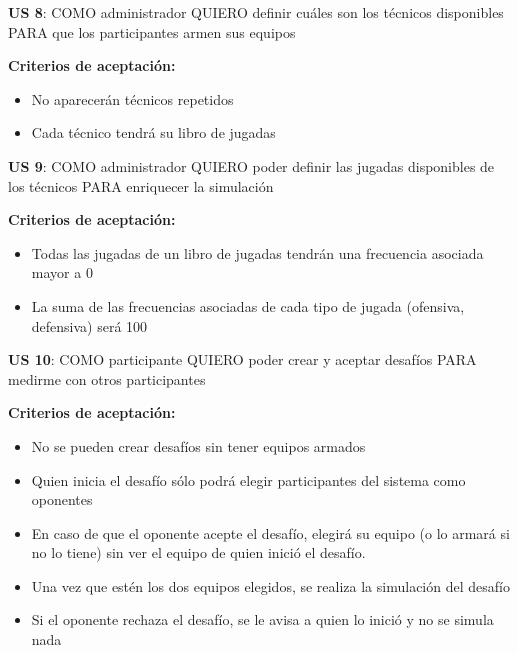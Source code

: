 \begin{tcolorbox}
\textbf{US 8}: COMO administrador QUIERO definir cuáles son los técnicos disponibles PARA que los participantes armen sus equipos

\vline

\textbf{Criterios de aceptación:}
\begin{itemize}
\item No aparecerán técnicos repetidos
\item Cada técnico tendrá su libro de jugadas
\end{itemize}
\end{tcolorbox}
\vspace{10pt}


\begin{tcolorbox}
\textbf{US 9}: COMO administrador QUIERO poder definir las jugadas disponibles de los técnicos PARA enriquecer la simulación

\vline

\textbf{Criterios de aceptación:}
\begin{itemize}
\item Todas las jugadas de un libro de jugadas tendrán una frecuencia asociada mayor a 0
\item La suma de las frecuencias asociadas de cada tipo de jugada (ofensiva, defensiva) será 100
\end{itemize}
\end{tcolorbox}
\vspace{10pt}


\begin{tcolorbox}
\textbf{US 10}: COMO participante QUIERO poder crear y aceptar desafíos PARA medirme con otros participantes

\vline

\textbf{Criterios de aceptación:}
\begin{itemize}
\item No se pueden crear desafíos sin tener equipos armados
\item Quien inicia el desafío sólo podrá elegir participantes del sistema como oponentes
\item En caso de que el oponente acepte el desafío, elegirá su equipo (o lo armará si no lo tiene) sin ver el equipo de quien inició el desafío.
\item Una vez que estén los dos equipos elegidos, se realiza la simulación del desafío
\item Si el oponente rechaza el desafío, se le avisa a quien lo inició y no se simula nada
\end{itemize}
\end{tcolorbox}
\vspace{10pt}


